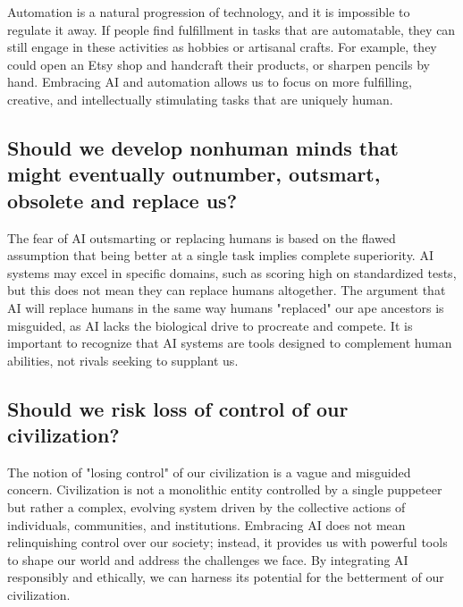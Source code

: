 Automation is a natural progression of technology, and it is impossible to regulate it away. If people find fulfillment in tasks that are automatable, they can still engage in these activities as hobbies or artisanal crafts. For example, they could open an Etsy shop and handcraft their products, or sharpen pencils by hand. Embracing AI and automation allows us to focus on more fulfilling, creative, and intellectually stimulating tasks that are uniquely human.

\subsection{Should we develop nonhuman minds that might eventually outnumber, outsmart, obsolete and replace us?}

The fear of AI outsmarting or replacing humans is based on the flawed assumption that being better at a single task implies complete superiority. AI systems may excel in specific domains, such as scoring high on standardized tests, but this does not mean they can replace humans altogether. The argument that AI will replace humans in the same way humans "replaced" our ape ancestors is misguided, as AI lacks the biological drive to procreate and compete. It is important to recognize that AI systems are tools designed to complement human abilities, not rivals seeking to supplant us.

\subsection{Should we risk loss of control of our civilization?}

The notion of "losing control" of our civilization is a vague and misguided concern. Civilization is not a monolithic entity controlled by a single puppeteer but rather a complex, evolving system driven by the collective actions of individuals, communities, and institutions. Embracing AI does not mean relinquishing control over our society; instead, it provides us with powerful tools to shape our world and address the challenges we face. By integrating AI responsibly and ethically, we can harness its potential for the betterment of our civilization.
